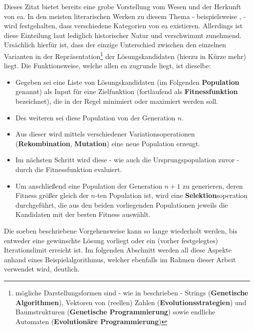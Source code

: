 		Dieses Zitat bietet bereits eine grobe Vorstellung vom Wesen und der Herkunft von \gls{ea}. In den meisten literarischen Werken zu diesem Thema - beispielsweise \cite{ger-kla-kru-intro}, \cite{eib-smi-ea} - wird festgehalten, dass verschiedene Kategorien von \gls{ea} existieren. Allerdings ist diese Einteilung laut \cite{eib-smi-ea} lediglich historischer Natur und verschwimmt zunehmend. Ursächlich hierfür ist, dass der einzige Unterschied zwischen den einzelnen Varianten in der Repräsentation\footnote{mögliche Darstellungsformen sind - wie in \cite{eib-smi-ea} beschrieben - Strings (\textbf{Genetische Algorithmen}), Vektoren von (reellen) Zahlen (\textbf{Evolutionsstrategien}) und Baumstrukturen (\textbf{Genetische Programmierung}) sowie endliche Automaten (\textbf{Evolutionäre Programmierung})} der Lösungskandidaten (hierzu in Kürze mehr) liegt. Die Funktionsweise, welche allen \gls{ea} zugrunde liegt, ist dieselbe: \\
		\begin{itemize}
			\item Gegeben sei eine Liste von Lösungskandidaten (im Folgenden \textbf{Population} genannt) als Input für eine Zielfunktion (fortlaufend als \textbf{Fitnessfunktion} bezeichnet), die in der Regel minimiert oder maximiert werden soll.
			\item Des weiteren sei diese Population von der Generation $n$.
			\item Aus dieser wird mittels verschiedener Variationsoperationen (\textbf{Rekombination}, \textbf{Mutation}) eine neue Population  erzeugt.
			\item Im nächsten Schritt wird diese - wie auch die Ursprungspopulation zuvor - durch die Fitnessfunktion evaluiert.
			\item Um anschließend eine Population der Generation $n+1$ zu generieren, deren Fitness größer gleich der $n$-ten Population ist, wird eine \textbf{Selektion}soperation durchgeführt, die aus den beiden vorliegenden Populationen jeweils die Kandidaten mit der besten Fitness auswählt.
		\end{itemize}
		
		Die soeben beschriebene Vorgehensweise kann so lange wiederholt werden, bis entweder eine gewünschte Lösung vorliegt oder ein (vorher festgelegtes) Iterationslimit erreicht ist. Im folgenden Abschnitt werden all diese Aspekte anhand eines Beispielalgorithmus, welcher ebenfalls im Rahmen dieser Arbeit verwendet wird, deutlich.\\
		
